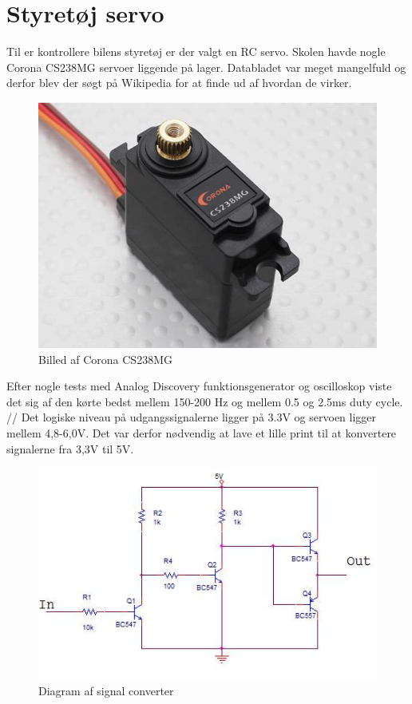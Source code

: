 
\section{Styretøj servo}

Til er kontrollere bilens styretøj er der valgt en RC servo. Skolen havde nogle Corona CS238MG \cite{Corona-CS238MG} servoer liggende på lager. Databladet var meget mangelfuld og derfor blev der søgt på Wikipedia \cite{wiki-RC-Servo} for at finde ud af hvordan de virker.

\begin{figure}[h]
	\centering
	\includegraphics[width=\textwidth* 6/10]{../fig/billeder/corona_RC_Servo}
	\caption{Billed af Corona CS238MG}
	\label{fig:Corona_CS238MG}
\end{figure}  

Efter nogle tests med Analog Discovery funktionsgenerator og oscilloskop viste det sig af den kørte bedst mellem 150-200 Hz og mellem 0.5 og 2.5ms duty cycle. //
Det logiske niveau på udgangssignalerne ligger på 3.3V og servoen ligger mellem 4,8-6,0V. Det var derfor nødvendig at lave et lille print til at konvertere signalerne fra 3,3V til 5V.  

\begin{figure}[h]
	\centering
	\includegraphics[width=\textwidth* 7/10]{../fig/billeder/servo_stepup}
	\caption{Diagram af signal converter}
	\label{fig:signal_converter}
\end{figure}  

